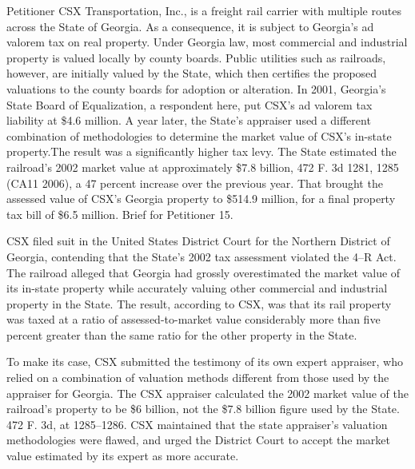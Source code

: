 \noindent Petitioner CSX Transportation, Inc., is a freight rail carrier with multiple routes across the State of Georgia. As a consequence, it is subject to Georgia's ad valorem tax on real property. Under Georgia law, most commercial and industrial property is valued locally by county boards. Public utilities such as railroads, however, are initially valued by the State, which then certifies the proposed valuations to the county boards for adoption or alteration. In 2001, Georgia's State Board of Equalization, a respondent here, put CSX's ad valorem tax liability at \$4.6 million. A year later, the State's appraiser used a different combination of methodologies to determine the market value of CSX's in-state property.\footnotemark[4] The result was a significantly higher tax levy. The State estimated the railroad's 2002 market value at approximately \$7.8 billion, 472 F. 3d 1281, 1285 (CA11 2006), a 47 percent increase over the previous year. That brought the assessed value of CSX's Georgia property to \$514.9 million, for a final property tax bill of \$6.5 million. Brief for Petitioner 15.

  CSX filed suit in the United States District Court for the Northern District of Georgia, contending that the State's 2002 tax assessment violated the 4--R Act. The railroad alleged that Georgia had grossly overestimated the market \newpage  value of its in-state property while accurately valuing other commercial and industrial property in the State. The result, according to CSX, was that its rail property was taxed at a ratio of assessed-to-market value considerably more than five percent greater than the same ratio for the other property in the State.


  To make its case, CSX submitted the testimony of its own expert appraiser, who relied on a combination of valuation methods different from those used by the appraiser for Georgia. The CSX appraiser calculated the 2002 market value of the railroad's property to be \$6 billion, not the \$7.8 billion figure used by the State. 472 F. 3d, at 1285--1286. CSX maintained that the state appraiser's valuation methodologies were flawed, and urged the District Court to accept the market value estimated by its expert as more accurate.

